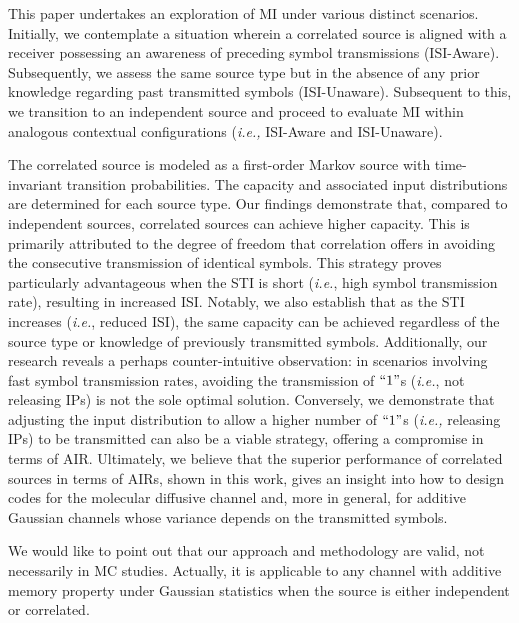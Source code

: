 \documentclass[journal]{IEEEtranTCOM}
\begin{document}
This paper undertakes an exploration of MI under various distinct scenarios. Initially, we contemplate a situation wherein a correlated source is aligned with a receiver possessing an awareness of preceding symbol transmissions (ISI-Aware). Subsequently, we assess the same source type but in the absence of any prior knowledge regarding past transmitted symbols (ISI-Unaware). Subsequent to this, we transition to an independent source and proceed to evaluate MI within analogous contextual configurations (\textit{i.e.,} ISI-Aware and ISI-Unaware).

The correlated source is modeled as a first-order Markov source with time-invariant transition probabilities. The capacity and associated input distributions are determined for each source type. Our findings demonstrate that, compared to independent sources, correlated sources can achieve higher capacity. This is primarily attributed to the degree of freedom that correlation offers in avoiding the consecutive transmission of identical symbols. This strategy proves particularly advantageous when the STI is short (\textit{i.e.}, high symbol transmission rate), resulting in increased ISI. Notably, we also establish that as the STI increases (\textit{i.e.}, reduced ISI), the same capacity can be achieved regardless of the source type or knowledge of previously transmitted symbols. Additionally, our research reveals a perhaps counter-intuitive observation: in scenarios involving fast symbol transmission rates, avoiding the transmission of $``1"$s (\textit{i.e.}, not releasing IPs) is not the sole optimal solution. Conversely, we demonstrate that adjusting the input distribution to allow a higher number of $``1"$s (\textit{i.e.,} releasing IPs) to be transmitted can also be a viable strategy, offering a compromise in terms of AIR. Ultimately, we believe that the superior performance of correlated sources in terms of AIRs, shown in this work, gives an insight into how to design codes for the molecular diffusive channel and, more in general, for additive Gaussian channels whose variance depends on the transmitted symbols.

We would like to point out that our approach and methodology are valid, not necessarily in MC studies. Actually, it is applicable to any channel with additive memory property under Gaussian statistics when the source is either independent or correlated.

\end{document}
